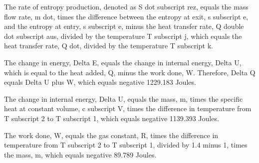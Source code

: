 The rate of entropy production, denoted as S dot subscript rez, equals the mass flow rate, m dot, times the difference between the entropy at exit, s subscript e, and the entropy at entry, s subscript e, minus the heat transfer rate, Q double dot subscript aus, divided by the temperature T subscript j, which equals the heat transfer rate, Q dot, divided by the temperature T subscript k.

The change in energy, Delta E, equals the change in internal energy, Delta U, which is equal to the heat added, Q, minus the work done, W. Therefore, Delta Q equals Delta U plus W, which equals negative 1229.183 Joules.

The change in internal energy, Delta U, equals the mass, m, times the specific heat at constant volume, c subscript V, times the difference in temperature from T subscript 2 to T subscript 1, which equals negative 1139.393 Joules.

The work done, W, equals the gas constant, R, times the difference in temperature from T subscript 2 to T subscript 1, divided by 1.4 minus 1, times the mass, m, which equals negative 89.789 Joules.